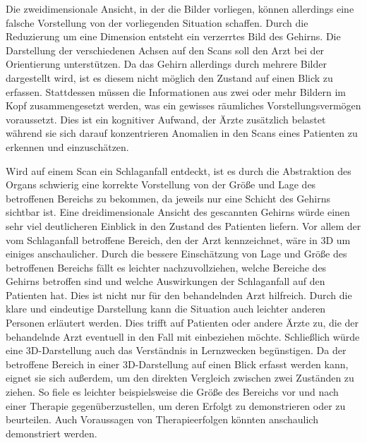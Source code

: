 Die zweidimensionale Ansicht, in der die Bilder vorliegen, können allerdings eine falsche Vorstellung von der vorliegenden Situation schaffen. 
Durch die Reduzierung um eine Dimension entsteht ein verzerrtes Bild des Gehirns. Die Darstellung der verschiedenen Achsen auf den Scans soll den Arzt bei der Orientierung unterstützen. Da das Gehirn allerdings durch mehrere Bilder dargestellt wird, ist es diesem nicht möglich den Zustand auf einen Blick zu erfassen. Stattdessen müssen die Informationen aus zwei oder mehr Bildern im Kopf zusammengesetzt werden, was ein gewisses räumliches Vorstellungsvermögen voraussetzt. Dies ist ein kognitiver Aufwand, der Ärzte zusätzlich belastet während sie sich darauf konzentrieren Anomalien in den Scans eines Patienten zu erkennen und einzuschätzen. 

Wird auf einem Scan ein Schlaganfall entdeckt, ist es durch die Abstraktion des Organs schwierig eine korrekte Vorstellung von der Größe und Lage des betroffenen Bereichs zu bekommen, da jeweils nur eine Schicht des Gehirns sichtbar ist. 
Eine dreidimensionale Ansicht des gescannten Gehirns würde einen sehr viel deutlicheren Einblick in den Zustand des Patienten liefern. Vor allem der vom Schlaganfall betroffene Bereich, den der Arzt kennzeichnet, wäre in 3D um einiges anschaulicher. Durch die bessere Einschätzung von Lage und Größe des betroffenen Bereichs fällt es leichter nachzuvollziehen, welche Bereiche des Gehirns betroffen sind und welche Auswirkungen der Schlaganfall auf den Patienten hat. Dies ist nicht nur für den behandelnden Arzt hilfreich. Durch die klare und eindeutige Darstellung kann die Situation auch leichter anderen Personen erläutert werden. Dies trifft auf Patienten oder andere Ärzte zu, die der behandelnde Arzt eventuell in den Fall mit einbeziehen möchte.
Schließlich würde eine 3D-Darstellung auch das Verständnis in Lernzwecken begünstigen. 
Da der betroffene Bereich in einer 3D-Darstellung auf einen Blick erfasst werden kann, eignet sie sich außerdem, um den direkten Vergleich zwischen zwei Zuständen zu ziehen. So fiele es leichter beispielsweise die Größe des Bereichs vor und nach einer Therapie gegenüberzustellen, um deren Erfolgt zu demonstrieren oder zu beurteilen.
Auch Voraussagen von Therapieerfolgen könnten anschaulich demonstriert werden.

